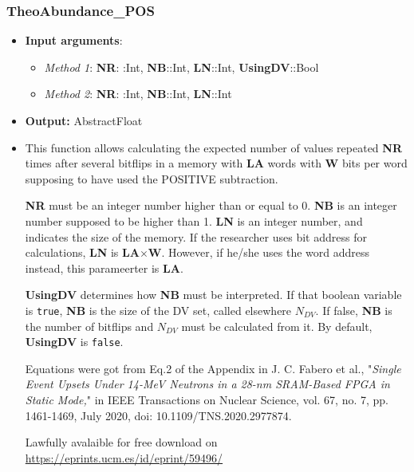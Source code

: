 \subsubsection*{TheoAbundance\_POS}\label{Subsec:TheoAbundance_POS}
%
\begin{itemize}
	\item \textbf{Input arguments}:
	\begin{itemize}
		\item \textit{Method 1}: \textbf{NR}: :Int, \textbf{NB}::Int, \textbf{LN}::Int, \textbf{UsingDV}::Bool
		\item \textit{Method 2}: \textbf{NR}: :Int, \textbf{NB}::Int, \textbf{LN}::Int
	\end{itemize}
	\item \textbf{Output:} AbstractFloat
	\item This function allows calculating the expected number of values repeated 	 \textbf{NR} times after several bitflips in a memory with \textbf{LA} words with \textbf{W} bits per word   	supposing to have used the POSITIVE subtraction.
	
	\textbf{NR} must be an integer number higher than or equal to 0. 
	\textbf{NB} is an integer number supposed to be higher than 1.
	\textbf{LN} is an integer number, and indicates the size of the memory. If the researcher uses bit address for calculations, \textbf{LN} is \textbf{LA}\(\times\)\textbf{W}. However, if he/she uses the word address instead, this parameerter is \textbf{LA}.
	
	\textbf{UsingDV} determines how \textbf{NB} must be interpreted. If that boolean variable is \texttt{true}, \textbf{NB} is the size of the DV set, called elsewhere \(N_{DV}\). If false, \textbf{NB} is the number of bitflips and \(N_{DV}\) must be calculated from it. By default, \textbf{UsingDV} is \texttt{false}.
	
	Equations were got from Eq.2 of the Appendix in J. C. Fabero et al., "\textit{Single Event Upsets Under 14-MeV Neutrons in a 28-nm
		SRAM-Based FPGA in Static Mode,}" in IEEE Transactions on Nuclear Science, vol.
	67, no. 7, pp. 1461-1469, July 2020, doi: 10.1109/TNS.2020.2977874.
	
	Lawfully avalaible for free download on \href{https://eprints.ucm.es/id/eprint/59496/}{https://eprints.ucm.es/id/eprint/59496/}
\end{itemize}

